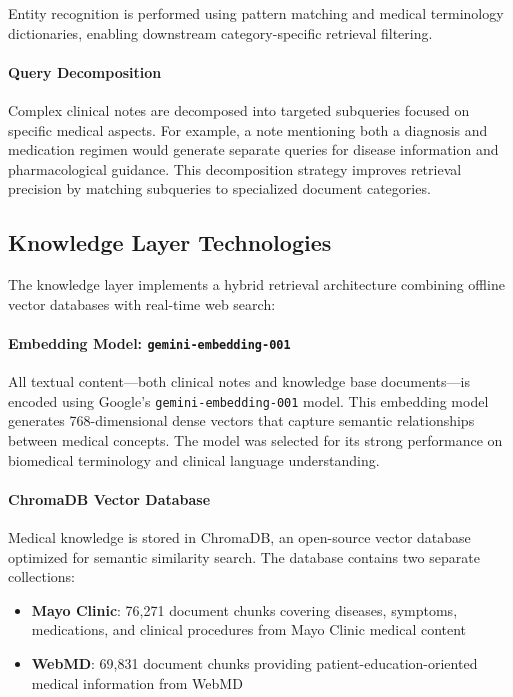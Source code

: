 \documentclass[11pt]{article}
\begin{document}
Entity recognition is performed using pattern matching and medical terminology dictionaries, enabling downstream category-specific retrieval filtering.

\paragraph{Query Decomposition}
Complex clinical notes are decomposed into targeted subqueries focused on specific medical aspects. For example, a note mentioning both a diagnosis and medication regimen would generate separate queries for disease information and pharmacological guidance. This decomposition strategy improves retrieval precision by matching subqueries to specialized document categories.

\subsection{Knowledge Layer Technologies}

The knowledge layer implements a hybrid retrieval architecture combining offline vector databases with real-time web search:

\paragraph{Embedding Model: \texttt{gemini-embedding-001}}
All textual content—both clinical notes and knowledge base documents—is encoded using Google's \texttt{gemini-embedding-001} model. This embedding model generates 768-dimensional dense vectors that capture semantic relationships between medical concepts. The model was selected for its strong performance on biomedical terminology and clinical language understanding.

\paragraph{ChromaDB Vector Database}
Medical knowledge is stored in ChromaDB, an open-source vector database optimized for semantic similarity search. The database contains two separate collections:
\begin{itemize}
    \item \textbf{Mayo Clinic}: 76,271 document chunks covering diseases, symptoms, medications, and clinical procedures from Mayo Clinic medical content
    \item \textbf{WebMD}: 69,831 document chunks providing patient-education-oriented medical information from WebMD
\end{itemize}
\end{document}
